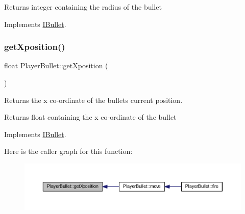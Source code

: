 \begin{DoxyReturn}{Returns}
integer containing the radius of the bullet 
\end{DoxyReturn}


Implements \hyperlink{class_i_bullet_a327968e71126cdea5998076d8919354f}{I\+Bullet}.

\mbox{\label{class_player_bullet_aa9462c44892190316ee479a18693b6ad}} 
\subsubsection{\texorpdfstring{get\+Xposition()}{getXposition()}}
{\footnotesize\ttfamily float Player\+Bullet\+::get\+Xposition (\begin{DoxyParamCaption}{ }\end{DoxyParamCaption})\hspace{0.3cm}{\ttfamily [virtual]}}



Returns the x co-\/ordinate of the bullets current position. 

\begin{DoxyReturn}{Returns}
float containing the x co-\/ordinate of the bullet 
\end{DoxyReturn}


Implements \hyperlink{class_i_bullet_a20babdd6c657ddda175e84a56564dcfa}{I\+Bullet}.

Here is the caller graph for this function\+:\nopagebreak
\begin{figure}[H]
\begin{center}
\leavevmode
\includegraphics[width=350pt]{class_player_bullet_aa9462c44892190316ee479a18693b6ad_icgraph}
\end{center}
\end{figure}
\mbox{\label{class_player_bullet_a240cab35d5d909366986b8661ee65d3c}} 

